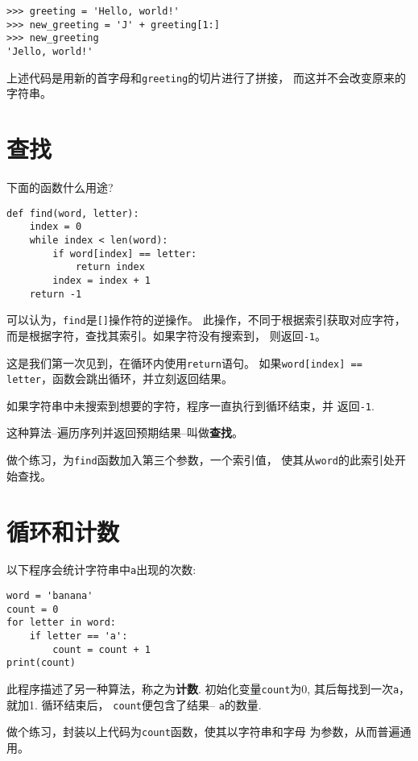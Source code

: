 \documentclass[10pt]{book}
\begin{document}
\begin{verbatim}
>>> greeting = 'Hello, world!'
>>> new_greeting = 'J' + greeting[1:]
>>> new_greeting
'Jello, world!'
\end{verbatim}
%
上述代码是用新的首字母和{\tt greeting}的切片进行了拼接，
而这并不会改变原来的字符串。


\section{查找}
\label{find}
下面的函数什么用途?

\begin{verbatim}
def find(word, letter):
    index = 0
    while index < len(word):
        if word[index] == letter:
            return index
        index = index + 1
    return -1
\end{verbatim}
%
可以认为，{\tt find}是{\tt []}操作符的逆操作。
此操作，不同于根据索引获取对应字符，
而是根据字符，查找其索引。如果字符没有搜索到，
则返回{\tt -1}。

这是我们第一次见到，在循环内使用{\tt return}语句。
如果{\tt word[index] == letter}，函数会跳出循环，并立刻返回结果。

如果字符串中未搜索到想要的字符，程序一直执行到循环结束，并
返回{\tt -1}.

这种算法--遍历序列并返回预期结果--叫做{\bf 查找}。

做个练习，为{\tt find}函数加入第三个参数，一个索引值，
使其从{\tt word}的此索引处开始查找。


\section{循环和计数}
\label{counter}
以下程序会统计字符串中{\tt a}出现的次数:

\begin{verbatim}
word = 'banana'
count = 0
for letter in word:
    if letter == 'a':
        count = count + 1
print(count)
\end{verbatim}
%
此程序描述了另一种算法，称之为{\bf 计数}.
初始化变量{\tt count}为0, 其后每找到一次{\tt a}，就加1.
循环结束后， {\tt count}便包含了结果-- {\tt a}的数量.

做个练习，封装以上代码为{\tt count}函数，使其以字符串和字母
为参数，从而普遍通用。
\end{document}
